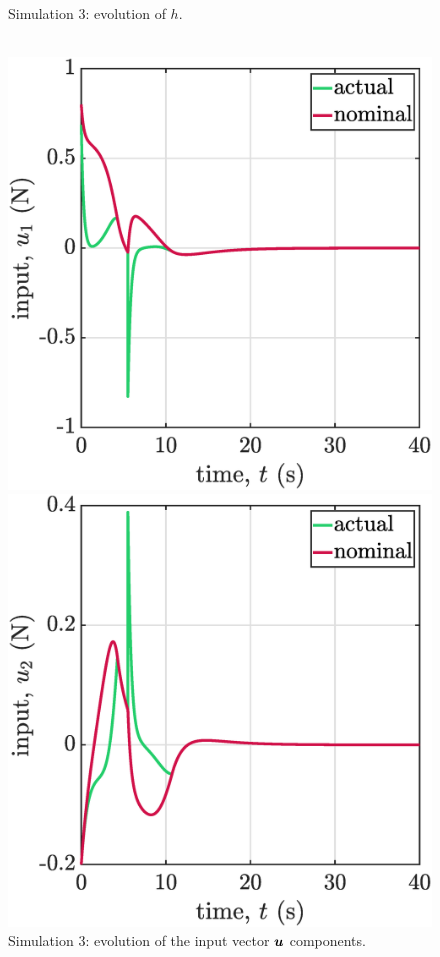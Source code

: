 \begin{figure}[!ht]
\begin{minipage}[b]{0.46\linewidth}
    \caption{\label{fig:sim3h}Simulation 3: evolution of $h$.\\~}
    \end{minipage}
    \begin{minipage}[t]{.45\textwidth}
        \centering
        \includegraphics[width=\textwidth]{figures/sim3u1.eps}
    \end{minipage}
    \hfill
    \begin{minipage}[t]{.45\textwidth}
        \centering
        \includegraphics[width=\textwidth]{figures/sim3u2.eps}
    \end{minipage}
    \caption{\label{fig:sim3u}Simulation 3: evolution of the input vector $\boldsymbol{u}$ components.}

\end{figure}

